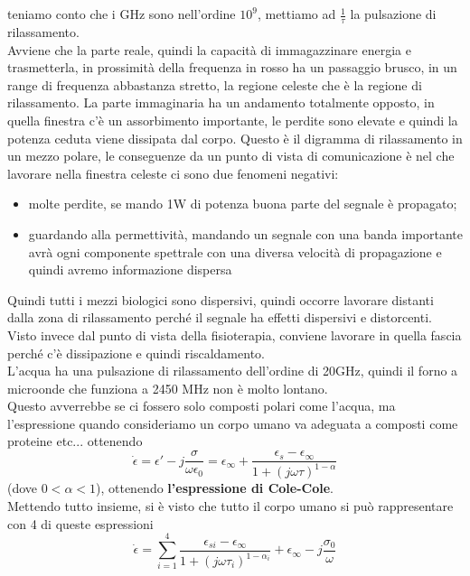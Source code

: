 \documentclass[oneside, 12pt]{extbook}
\begin{document}
\\\\teniamo conto che i GHz sono nell'ordine $10^9$, mettiamo ad $\frac{1}{\tau}$ la pulsazione di rilassamento.\\Avviene che la parte reale, quindi la capacità di immagazzinare energia e trasmetterla, in prossimità della frequenza in rosso ha un passaggio brusco, in un range di frequenza abbastanza stretto, la regione celeste che è la regione di rilassamento. La parte immaginaria ha un andamento totalmente opposto, in quella finestra c'è un assorbimento importante, le perdite sono elevate e quindi la potenza ceduta viene dissipata dal corpo. Questo è il digramma di rilassamento in un mezzo polare, le conseguenze da un punto di vista di comunicazione è nel che lavorare nella finestra celeste ci sono due fenomeni negativi:
\begin{itemize}
	\item molte perdite, se mando 1W di potenza buona parte del segnale è propagato;
	\item guardando alla permettività, mandando un segnale con una banda importante avrà ogni componente spettrale con una diversa velocità di propagazione e quindi avremo informazione dispersa
\end{itemize}
Quindi tutti i mezzi biologici sono dispersivi, quindi occorre lavorare distanti dalla zona di rilassamento perché il segnale ha effetti dispersivi e distorcenti.\\Visto invece dal punto di vista della fisioterapia, conviene lavorare in quella fascia perché c'è dissipazione e quindi riscaldamento.\\L'acqua ha una pulsazione di rilassamento dell'ordine di 20GHz, quindi il forno a microonde che funziona a 2450 MHz non è molto lontano.\\Questo avverrebbe se ci fossero solo composti polari come l'acqua, ma l'espressione quando consideriamo un corpo umano va adeguata a composti come proteine etc... ottenendo
\begin{equation}
	\dot{\epsilon} = \epsilon' - j \frac{\sigma}{\omega\epsilon_0} = \epsilon_{\infty} + \dfrac{\epsilon_s - \epsilon_{\infty}}{1 + (j \omega \tau)^{1 - \alpha}}
\end{equation}
(dove $0 < \alpha < 1$), 
ottenendo \textbf{l'espressione di Cole-Cole}.\\Mettendo tutto insieme, si è visto che tutto il corpo umano si può rappresentare con 4 di queste espressioni
\begin{equation}
	\dot{\epsilon} = \sum\limits_{i = 1}^{4} \dfrac{\epsilon_{si} - \epsilon_{\infty}}{1 + (j \omega \tau_i)^{1 - \alpha_i}} + \epsilon_{\infty} - j \frac{\sigma_0}{\omega}
\end{equation}
\end{document}
